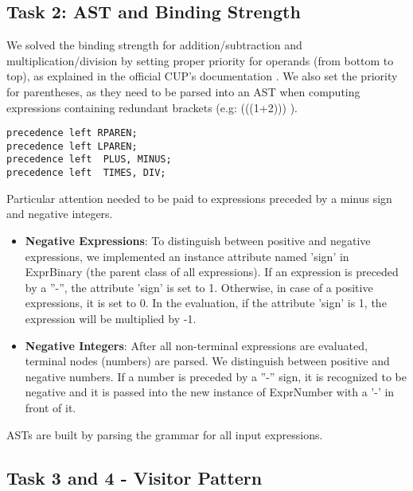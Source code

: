 \documentclass[paper=a4, fontsize=11pt]{scrartcl}
\numberwithin{equation}{section}		%
\numberwithin{figure}{section}			%
\numberwithin{table}{section}				%
\begin{document}
\subsection*{Task 2: AST and Binding Strength}
\label{Task2}
We solved the binding strength for addition/subtraction and multiplication/division by setting proper priority for operands (from bottom to top), as explained in the official CUP's documentation \cite{key01}. We also set the priority for parentheses, as they need to be parsed into an AST when computing expressions containing redundant brackets (e.g: (((1+2))) ).

\begin{lstlisting}
precedence left RPAREN;
precedence left LPAREN;
precedence left  PLUS, MINUS;
precedence left  TIMES, DIV;
\end{lstlisting}

Particular attention needed to be paid to expressions preceded by a minus sign and negative integers. 
\begin{itemize}
	\item \textbf{Negative Expressions}: To distinguish between positive and negative expressions, we implemented an instance attribute named 'sign' in ExprBinary (the parent class of all expressions).
If an expression is preceded by a ''-'', the attribute 'sign' is set to 1. Otherwise, in case of a positive expressions, it is set to 0. In the evaluation, if the attribute 'sign' is 1, the expression will be multiplied by -1. 
	\item \textbf{Negative Integers}: After all non-terminal expressions are evaluated, terminal nodes (numbers) are parsed. We distinguish between positive and negative numbers. If a number is preceded by a ''-'' sign, it is recognized to be negative and it is passed into the new instance of ExprNumber with a '-' in front of it. 
\end{itemize}
ASTs are built by parsing the grammar for all input expressions.  

\subsection*{Task 3 and 4 - Visitor Pattern}
\end{document}
